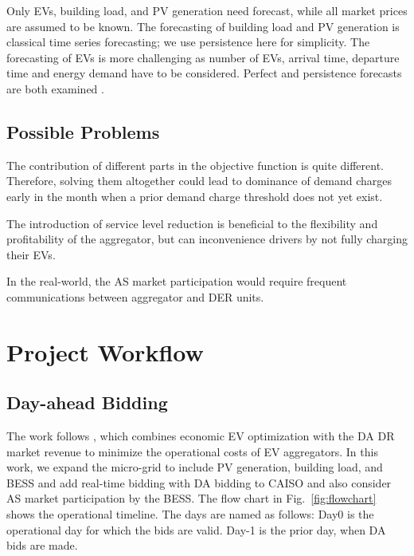 \documentclass[conference]{IEEEtran}
\begin{document}
Only EVs, building load, and PV generation need forecast, while all market prices are assumed to be known. The forecasting of building load and PV generation is classical time series forecasting; we use persistence here for simplicity. The forecasting of EVs is more challenging as number of EVs, arrival time, departure time and energy demand have to be considered. Perfect and persistence forecasts are both examined . 

\subsection{Possible Problems}
The contribution of different parts in the objective function is quite different. Therefore, solving them altogether could lead to dominance of demand charges early in the month when a prior demand charge threshold does not yet exist. %

The introduction of service level reduction is beneficial to the flexibility and profitability of the aggregator, but can inconvenience drivers by not fully charging their EVs.

In the real-world, the AS market participation would require frequent communications between aggregator and DER units. 






\section{Project Workflow}

\subsection{Day-ahead Bidding}
The work follows \cite{chen2024cost}, which combines economic EV optimization with the DA DR market revenue to minimize the operational costs of EV aggregators. In this work, we expand the micro-grid to include PV generation, building load, and BESS and add real-time bidding with DA bidding to CAISO and also consider AS market participation by the BESS. The flow chart in Fig.~\ref{fig:flowchart} shows the operational timeline. The days are named as follows: Day0 is the operational day for which the bids are valid. Day-1 is the prior day, when DA bids are made.
\end{document}
